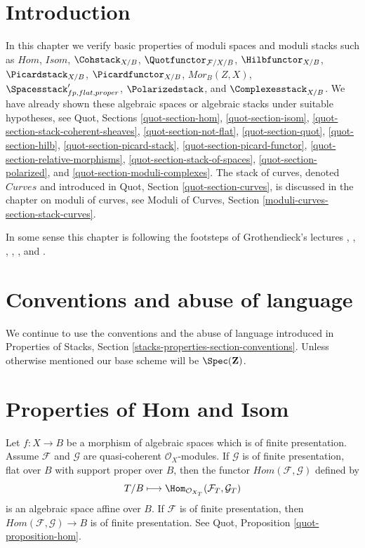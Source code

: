 \section{Introduction}
\label{moduli-section-introduction}
In this chapter we verify basic properties of moduli spaces
and moduli stacks such as
$\mathit{Hom}$, $\mathit{Isom}$, $\Cohstack_{X/B}$,
$\Quotfunctor_{\mathcal{F}/X/B}$, $\Hilbfunctor_{X/B}$,
$\Picardstack_{X/B}$, $\Picardfunctor_{X/B}$, $\mathit{Mor}_B(Z, X)$,
$\Spacesstack'_{fp, flat, proper}$, $\Polarizedstack$, and
$\Complexesstack_{X/B}$.
We have already shown these algebraic spaces or algebraic stacks
under suitable hypotheses, see Quot, Sections
\ref{quot-section-hom},
\ref{quot-section-isom},
\ref{quot-section-stack-coherent-sheaves},
\ref{quot-section-not-flat},
\ref{quot-section-quot},
\ref{quot-section-hilb},
\ref{quot-section-picard-stack},
\ref{quot-section-picard-functor},
\ref{quot-section-relative-morphisms},
\ref{quot-section-stack-of-spaces},
\ref{quot-section-polarized}, and
\ref{quot-section-moduli-complexes}.
The stack of curves, denoted $\textit{Curves}$ and introduced
in Quot, Section \ref{quot-section-curves}, is discussed in the
chapter on moduli of curves, see
Moduli of Curves, Section \ref{moduli-curves-section-stack-curves}.

\medskip\noindent
In some sense this chapter is following the footsteps of
Grothendieck's lectures \cite{Gr-I},
\cite{Gr-II},
\cite{Gr-III},
\cite{Gr-IV},
\cite{Gr-V}, and
\cite{Gr-VI}.

\section{Conventions and abuse of language}
\label{moduli-section-conventions}
We continue to use the conventions and the abuse of language
introduced in
Properties of Stacks, Section \ref{stacks-properties-section-conventions}.
Unless otherwise mentioned our base scheme will be $\Spec(\mathbf{Z})$.

\section{Properties of Hom and Isom}
\label{moduli-section-hom-isom}
Let $f : X \to B$ be a morphism of algebraic spaces which is
of finite presentation. Assume $\mathcal{F}$ and $\mathcal{G}$
are quasi-coherent $\mathcal{O}_X$-modules.
If $\mathcal{G}$ is of finite presentation, flat over $B$
with support proper over $B$, then the functor
$\mathit{Hom}(\mathcal{F}, \mathcal{G})$ defined by
$$
T/B \longmapsto \Hom_{\mathcal{O}_{X_T}}(\mathcal{F}_T, \mathcal{G}_T)
$$
is an algebraic space affine over $B$. If $\mathcal{F}$ is of
finite presentation, then
$\mathit{Hom}(\mathcal{F}, \mathcal{G}) \to B$
is of finite presentation. See
Quot, Proposition \ref{quot-proposition-hom}.

